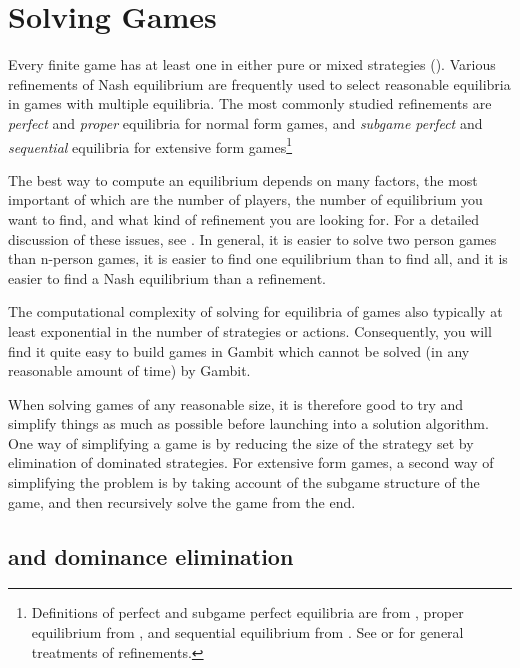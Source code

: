 %
%
%

\chapter{Solving Games}

Every finite game has at least one  in either pure or mixed
strategies (\cite{Nash:1950}).  Various refinements of Nash
equilibrium are frequently used to select reasonable equilibria in
games with multiple equilibria.  The most commonly studied refinements
are {\em perfect} and {\em proper} equilibria for normal form games,
and {\em subgame perfect} and {\em sequential} equilibria for
extensive form games\footnote{Definitions of perfect and subgame perfect
equilibria are from \cite{Selten:1975}, proper equilibrium from
\cite{Myerson:78}, and sequential equilibrium from
\cite{KrepsWilson:1982}.  See \cite{vanDamme:1987} or \cite{Mye:91}
for general treatments of refinements.}

The best way to compute an equilibrium depends on many factors, the
most important of which are the number of players, the number of
equilibrium you want to find, and what kind of refinement you are
looking for.  For a detailed discussion of these issues, see
\cite{McKMcL:1996}.  In general, it is easier to solve two person
games than n-person games, it is easier to find one equilibrium than
to find all, and it is easier to find a Nash equilibrium than a
refinement.

The computational complexity of solving for equilibria of games also
typically at least exponential in the number of strategies or actions.
Consequently, you will find it quite easy to build games in Gambit
which cannot be solved (in any reasonable amount of time) by Gambit.

When solving games of any reasonable size, it is therefore good to try
and simplify things as much as possible before launching into a
solution algorithm.  One way of simplifying a game is by reducing the
size of the strategy set by elimination of dominated strategies.  For
extensive form games, a second way of simplifying the problem is by
taking account of the subgame structure of the game, and then
recursively solve the game from the end.

\section{ and dominance elimination}


